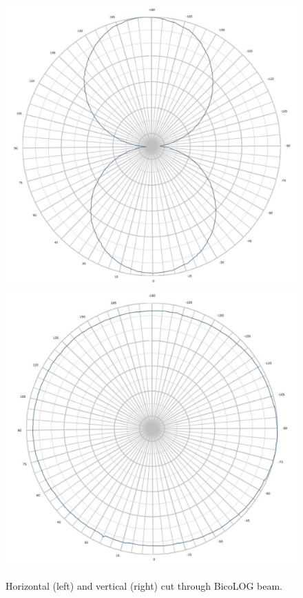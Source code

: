 \documentclass[preprint2]{aastex}
\begin{document}
\begin{center}
\begin{figure}[h]
\centering
\includegraphics[scale=0.4]{images/bicolog_horizontal_cut.png}
\includegraphics[scale=0.4]{images/bicolog_vertical_cut.png}
\caption{Horizontal (left) and vertical (right) cut through BicoLOG beam.}
\label{fig:BicoLOG cuts}
\end{figure}

\end{center}
\end{document}

